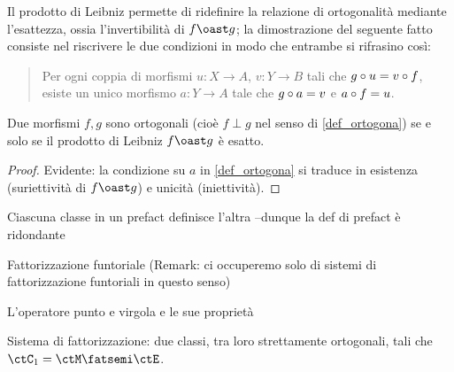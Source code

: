 Il prodotto di Leibniz permette di ridefinire la relazione di ortogonalità mediante l'esattezza, ossia l'invertibilità di \(f\oast g\); la dimostrazione del seguente fatto consiste nel riscrivere le due condizioni in modo che entrambe si rifrasino così:
\begin{quote}
	Per ogni coppia di morfismi \(u : X\to A\), \(v : Y\to B\) tali che \(g\circ u=v\circ f\), esiste un unico morfismo \(a : Y\to A\) tale che \(g\circ a=v\) e \(a\circ f=u\).
\end{quote}
\begin{proposition}
	Due morfismi \(f,g\) sono ortogonali (cioè \(f\perp g\) nel senso di \ref{def_ortogona}) se e solo se il prodotto di Leibniz \(f\oast g\) è esatto.
\end{proposition}
\begin{proof}
	Evidente: la condizione su \(a\) in \ref{def_ortogona} si traduce in esistenza (suriettività di \(f\oast g\)) e unicità (iniettività).
\end{proof}
\begin{definition}
	\Todo{}
\end{definition}
\begin{proposition}
	Ciascuna classe in un prefact definisce l'altra --dunque la def di prefact è ridondante
\end{proposition}
\begin{definition}\label{fat_funno}
	Fattorizzazione funtoriale
	(Remark: ci occuperemo solo di sistemi di fattorizzazione funtoriali in questo senso)
\end{definition}
\begin{definition}
	L'operatore punto e virgola e le sue proprietà
\end{definition}
\begin{definition}
	Sistema di fattorizzazione: due classi, tra loro strettamente ortogonali, tali che \(\ctC_1 = \ctM \fatsemi \ctE\).
\end{definition}

